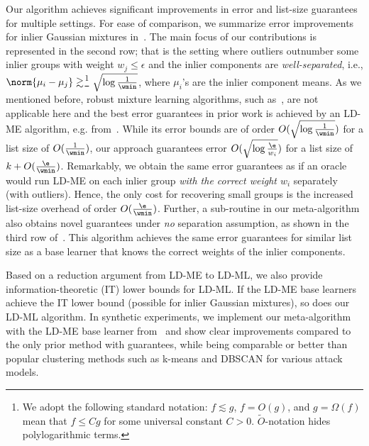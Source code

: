 Our algorithm achieves significant improvements in error and list-size guarantees for multiple settings. For ease of comparison, we summarize error improvements for inlier Gaussian mixtures in~. 
The main focus of our contributions is represented in the second row; that is the  setting where outliers outnumber some inlier groups with weight $w_j \leq \epsilon$
and the inlier components are \emph{well-separated}, i.e., \(\norm{\mu_i - \mu_j} \gtrsim\)\footnote{We adopt the following standard notation: \(f \lesssim g\), \(f = O(g)\), and \(g = \Omega(f)\) mean that \(f \leq Cg\) for some universal constant \(C > 0\). \(\widetilde O\)-notation hides polylogarithmic terms.} \(\sqrt{\log \frac{1}{\wmin}}\), where \(\mu_i\)'s are the inlier component means.
As we mentioned before, robust mixture learning algorithms, such as~\cite{bakshi2022robustly, ivkov2022list}, are not applicable here and the best error guarantees in prior work is achieved by an LD-ME algorithm, e.g. from~\cite{diakonikolas2018list}. While its error bounds are of order \(O(\sqrt{\log \frac{1}{\wmin}})\) for a list size of \(O(\frac{1}{\wmin})\), 
our approach guarantees error \(O(\sqrt{\log \frac{\e}{w_i}})\)
for a list size of \(k + O(\frac{\e}{\wmin})\).
Remarkably, we obtain the same error guarantees as if an oracle would run LD-ME on each inlier group \emph{with the correct weight \(w_i\)} separately (with outliers).
Hence, the only cost for recovering small groups is the increased list-size overhead of order \(O(\frac{\e}{\wmin})\).
Further, a sub-routine in our meta-algorithm also obtains novel guarantees under \emph{no} separation assumption,
as shown in the third row of~.
This algorithm achieves the same error guarantees for similar list size as a base learner that knows 
the correct weights of the inlier components.

Based on a reduction argument from LD-ME to LD-ML, we also provide information-theoretic (IT) lower bounds for LD-ML. If the LD-ME base learners achieve the IT lower bound (possible for inlier Gaussian mixtures), so does our LD-ML algorithm. 
In synthetic experiments, we implement our meta-algorithm with the LD-ME base learner from~\cite{diakonikolas2022clustering} and show clear improvements compared to the only prior method with guarantees, while being comparable or better than popular clustering methods such as k-means and DBSCAN for various attack models.